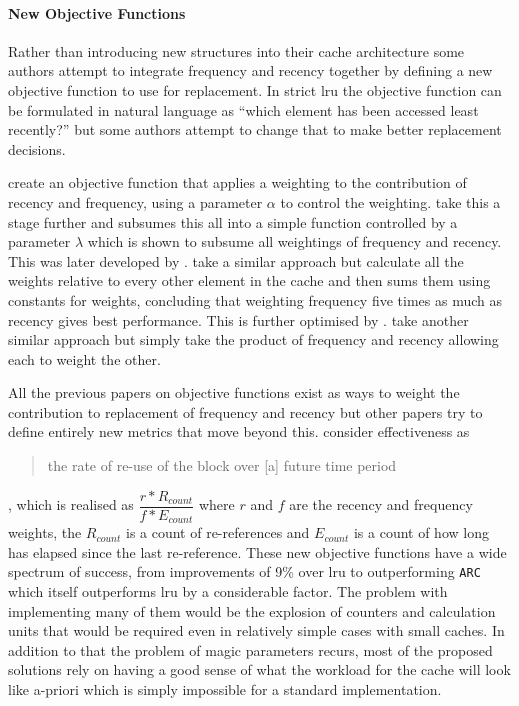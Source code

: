 \paragraph{New Objective Functions}

Rather than introducing new structures into their cache architecture some authors attempt to integrate frequency and recency together by defining a new objective function to use for replacement. In strict \gls{lru} the objective function can be formulated in natural language as ``which element has been accessed least recently?'' but some authors attempt to change that to make better replacement decisions.

\citet{reddyIntelligentWebCaching1998} create an objective function that applies a weighting to the contribution of recency and frequency, using a parameter $\alpha$ to control the weighting. \citeauthor{dongheeleeImplementationPerformanceEvaluation1997} \cite{dongheeleeLRFUSpectrumPolicies2001} take this a stage further and subsumes this all into a simple function controlled by a parameter $\lambda$ which is shown to subsume all weightings of frequency and recency. This was later developed by \citet{cuiNewHybridApproach2003}. \citet{abdelfattahLeastRecentlyFive2012} take a similar approach but calculate all the weights relative to every other element in the cache and then sums them using constants for weights, concluding that weighting frequency five times as much as recency gives best performance. This is further optimised by \citet{anandkumarHybridCacheReplacement2014}. \citet{dasArbitrationCacheReplacements2016} take another similar approach but simply take the product of frequency and recency allowing each to weight the other.

All the previous papers on objective functions exist as ways to weight the contribution to replacement of frequency and recency but other papers try to define entirely new metrics that move beyond this. \citet{tianEffectivenessbasedAdaptiveCache2014} consider effectiveness as \blockcquote{tianEffectivenessbasedAdaptiveCache2014}{the rate of re-use of the block over [a] future time period}, which is realised as $\dfrac{r*R_{count}}{f*E_{count}}$ where $r$ and $f$ are the recency and frequency weights, the $R_{count}$ is a count of re-references and $E_{count}$ is a count of how long has elapsed since the last re-reference. These new objective functions have a wide spectrum of success, from improvements of 9\% over \gls{lru} to outperforming \texttt{ARC} which itself outperforms \gls{lru} by a considerable factor. The problem with implementing many of them would be the explosion of counters and calculation units that would be required even in relatively simple cases with small caches. In addition to that the problem of magic parameters recurs, most of the proposed solutions rely on having a good sense of what the workload for the cache will look like a-priori which is simply impossible for a standard implementation.

